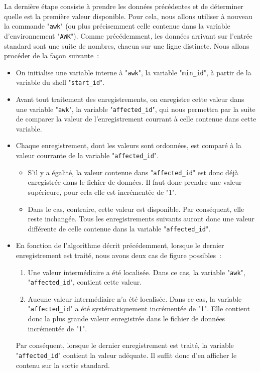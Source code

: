 La derni{\`e}re {\'e}tape consiste {\`a} prendre les donn{\'e}es pr{\'e}c{\'e}dentes et de d{\'e}terminer
quelle est la premi{\`e}re valeur disponible. Pour cela, nous allons utiliser {\`a} nouveau
la commande "{\tt awk}" (ou plus pr{\'e}cisemment celle contenue dans la variable
d'environnement "{\tt AWK}"). Comme pr{\'e}c{\'e}demment, les donn{\'e}es arrivant
sur l'entr{\'e}e standard sont une suite de nombres, chacun sur une ligne distincte.
Nous allons proc{\'e}der de la fa\c{c}on suivante~:
\begin{itemize}
	\item	On initialise une variable interne {\`a} "{\tt awk}", la variable
			"{\tt min\_id}", {\`a} partir de la variable du shell
			"{\tt start\_id}".
	\item	Avant tout traitement des enregistrements, on enregistre cette
			valeur dans une variable "{\tt awk}", la variable
			"{\tt affected\_id}", qui nous permettra par la suite de comparer
			la valeur de l'enregistrement courrant {\`a} celle contenue dans cette
			variable.
	\item	Chaque enregistrement, dont les valeurs sont ordonn{\'e}es, est compar{\'e}
			{\`a} la valeur courrante de la variable "{\tt affected\_id}".
			\begin{itemize}
				\item	S'il y a {\'e}galit{\'e}, la valeur contenue dans
						"{\tt affected\_id}" est donc
						d{\'e}j{\`a} enregistr{\'e}e dans le fichier de donn{\'e}es.
						Il faut donc prendre une valeur sup{\'e}rieure, pour cela elle
						est incr{\'e}ment{\'e}e de "1".
				\item	Dans le cas, contraire, cette valeur est disponible. Par
						cons{\'e}quent, elle reste inchang{\'e}e. Tous les enregistrements
						suivants auront donc une valeur diff{\'e}rente de celle contenue
						dans la variable "{\tt affected\_id}".
			\end{itemize}
	\item	En fonction de l'algorithme d{\'e}crit pr{\'e}c{\'e}demment, lorsque le dernier
			enregistrement est trait{\'e}, nous avons deux cas de figure possibles~:
			\begin{enumerate}
				\item	Une valeur interm{\'e}diaire a {\'e}t{\'e} localis{\'e}e. Dans ce cas,
						la variable "{\tt awk}", "{\tt affected\_id}",
						contient cette valeur.
				\item	Aucune valeur interm{\'e}diaire n'a {\'e}t{\'e} localis{\'e}e. Dans ce
						cas, la variable "{\tt affected\_id}" a {\'e}t{\'e}
						syst{\'e}matiquement incr{\'e}ment{\'e}e de "1". Elle contient
						donc la plus grande valeur enregistr{\'e}e dans le fichier
						de donn{\'e}es incr{\'e}ment{\'e}e de "1".
			\end{enumerate}
			Par cons{\'e}quent, lorsque le dernier enregistrement est trait{\'e}, la
			variable "{\tt affected\_id}" contient la valeur ad{\'e}quate. Il suffit
			donc d'en afficher le contenu sur la sortie standard.
\end{itemize}
